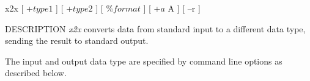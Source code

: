 % 
% 
% 
% 
%                                                                        
%
\hypertarget{x2x}{}

\begin{synopsis}
\item[x2x] [ +$type1$ ] [ +$type2$ ] [ $\%format$ ] [ +$a$ A ] [ --r ]
\end{synopsis}

\begin{qsection}{DESCRIPTION}
{\em x2x} converts data from standard input to a different data type,
sending the result to standard output.

The input and output data type are specified by command line options 
as described below.
\end{qsection}

